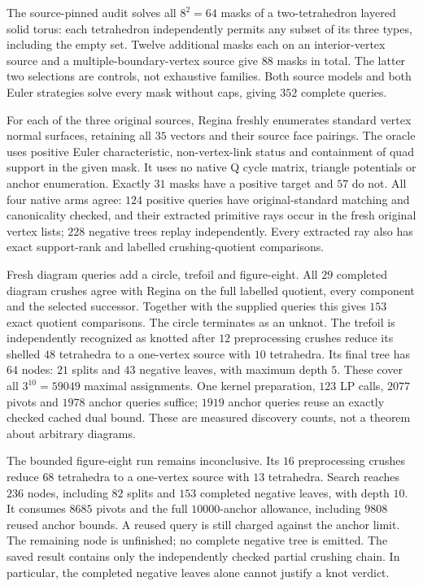 The source-pinned audit solves all $8^2=64$ masks of a two-tetrahedron
layered solid torus: each tetrahedron independently permits any subset of
its three types, including the empty set.  Twelve additional masks each on
an interior-vertex source and a multiple-boundary-vertex source give $88$
masks in total.  The latter two selections are controls, not exhaustive
families.  Both source models and both Euler strategies solve every mask
without caps, giving $352$ complete queries.

For each of the three original sources, Regina freshly enumerates standard
vertex normal surfaces, retaining all $35$ vectors and their source face
pairings.  The oracle uses positive Euler characteristic, non-vertex-link
status and containment of quad support in the given mask.  It uses no native
Q cycle matrix, triangle potentials or anchor enumeration.  Exactly $31$
masks have a positive target and $57$ do not.  All four native arms agree:
$124$ positive queries have original-standard matching and canonicality
checked, and their extracted primitive rays occur in the fresh original
vertex lists; $228$ negative trees replay independently.  Every extracted
ray also has exact support-rank and labelled crushing-quotient comparisons.

Fresh diagram queries add a circle, trefoil and figure-eight.  All $29$
completed diagram crushes agree with Regina on the full labelled quotient,
every component and the selected successor.  Together with the supplied
queries this gives $153$ exact quotient comparisons.  The circle terminates
as an unknot.  The trefoil is independently recognized as knotted after
$12$ preprocessing crushes reduce its shelled $48$ tetrahedra to a one-vertex
source with $10$ tetrahedra.  Its final tree has $64$ nodes: $21$ splits and
$43$ negative leaves, with maximum depth $5$.  These cover all
$3^{10}=59049$ maximal assignments.  One kernel preparation, $123$ LP calls,
$2077$ pivots and $1978$ anchor queries suffice; $1919$ anchor queries reuse
an exactly checked cached dual bound.  These are measured discovery counts,
not a theorem about arbitrary diagrams.

The bounded figure-eight run remains inconclusive.  Its $16$ preprocessing
crushes reduce $68$ tetrahedra to a one-vertex source with $13$ tetrahedra.
Search reaches $236$ nodes, including $82$ splits and $153$ completed negative
leaves, with depth $10$.  It consumes $8685$ pivots and the full $10000$-anchor
allowance, including $9808$ reused anchor bounds.  A reused query is still
charged against the anchor limit.  The remaining node is unfinished; no
complete negative tree is emitted.  The saved result contains only the
independently checked partial crushing chain.  In particular, the completed
negative leaves alone cannot justify a knot verdict.


